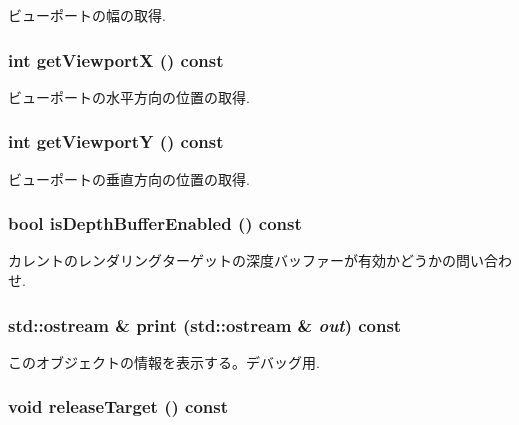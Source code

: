ビューポートの幅の取得. \hypertarget{classm3g_1_1Graphics3D_af58b44cc6219f86c40dadb8a9377856}{
\subsubsection[{getViewportX}]{\setlength{\rightskip}{0pt plus 5cm}int getViewportX () const}}
\label{classm3g_1_1Graphics3D_af58b44cc6219f86c40dadb8a9377856}


ビューポートの水平方向の位置の取得. \hypertarget{classm3g_1_1Graphics3D_c21665afbf94a8f0153e099833c2b61a}{
\subsubsection[{getViewportY}]{\setlength{\rightskip}{0pt plus 5cm}int getViewportY () const}}
\label{classm3g_1_1Graphics3D_c21665afbf94a8f0153e099833c2b61a}


ビューポートの垂直方向の位置の取得. \hypertarget{classm3g_1_1Graphics3D_7f17c6781152840d42e756c27b0fb8c8}{
\subsubsection[{isDepthBufferEnabled}]{\setlength{\rightskip}{0pt plus 5cm}bool isDepthBufferEnabled () const}}
\label{classm3g_1_1Graphics3D_7f17c6781152840d42e756c27b0fb8c8}


カレントのレンダリングターゲットの深度バッファーが有効かどうかの問い合わせ. \hypertarget{classm3g_1_1Graphics3D_6fea17fa1532df3794f8cb39cb4f911f}{
\subsubsection[{print}]{\setlength{\rightskip}{0pt plus 5cm}std::ostream \& print (std::ostream \& {\em out}) const}}
\label{classm3g_1_1Graphics3D_6fea17fa1532df3794f8cb39cb4f911f}


このオブジェクトの情報を表示する。デバッグ用. \hypertarget{classm3g_1_1Graphics3D_3ffaaf0d0f1e97a07c7f30c9b5a5dd32}{
\subsubsection[{releaseTarget}]{\setlength{\rightskip}{0pt plus 5cm}void releaseTarget () const}}
\label{classm3g_1_1Graphics3D_3ffaaf0d0f1e97a07c7f30c9b5a5dd32}


